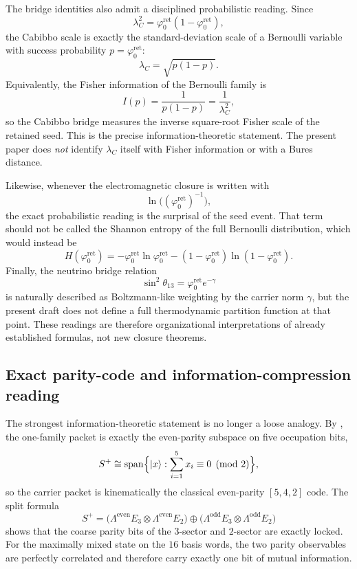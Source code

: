 \documentclass[11pt,a4paper]{article}
\theoremstyle{definition}
\theoremstyle{remark}
\newcommand{\phiz}{\varphi_0^{\mathrm{ret}}}
\begin{document}
The bridge identities also admit a disciplined probabilistic reading. Since
\[
\lambda_C^2=\phiz(1-\phiz),
\]
the Cabibbo scale is exactly the standard-deviation scale of a Bernoulli variable with success probability $p=\phiz$:
\[
\lambda_C=\sqrt{p(1-p)}.
\]
Equivalently, the Fisher information of the Bernoulli family is
\[
I(p)=\frac{1}{p(1-p)}=\frac{1}{\lambda_C^2},
\]
so the Cabibbo bridge measures the inverse square-root Fisher scale of the retained seed. This is the precise information-theoretic statement. The present paper does \emph{not} identify $\lambda_C$ itself with Fisher information or with a Bures distance.

Likewise, whenever the electromagnetic closure is written with
\[
\ln\!\bigl((\phiz)^{-1}\bigr),
\]
the exact probabilistic reading is the surprisal of the seed event. That term should not be called the Shannon entropy of the full Bernoulli distribution, which would instead be
\[
H(\phiz)
=
-\phiz\ln\phiz-(1-\phiz)\ln(1-\phiz).
\]
Finally, the neutrino bridge relation
\[
\sin^2\theta_{13}=\phiz e^{-\gamma}
\]
is naturally described as Boltzmann-like weighting by the carrier norm $\gamma$, but the present draft does not define a full thermodynamic partition function at that point. These readings are therefore organizational interpretations of already established formulas, not new closure theorems.

\subsection{Exact parity-code and information-compression reading}

The strongest information-theoretic statement is no longer a loose analogy. By , the one-family packet is exactly the even-parity subspace on five occupation bits,
\[
S^+
\cong
\mathrm{span}\Bigl\{|x\rangle:\sum_{i=1}^5 x_i\equiv 0 \pmod 2\Bigr\},
\]
so the carrier packet is kinematically the classical even-parity $[5,4,2]$ code. The split formula
\[
S^+
=
\bigl(\Lambda^{\mathrm{even}}E_3\otimes\Lambda^{\mathrm{even}}E_2\bigr)
\oplus
\bigl(\Lambda^{\mathrm{odd}}E_3\otimes\Lambda^{\mathrm{odd}}E_2\bigr)
\]
shows that the coarse parity bits of the $3$-sector and $2$-sector are exactly locked. For the maximally mixed state on the $16$ basis words, the two parity observables are perfectly correlated and therefore carry exactly one bit of mutual information.
\end{document}
